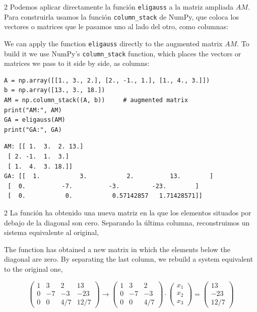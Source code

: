\begin{paracol}{2}
Podemos aplicar directamente la función \texttt{eligauss} a la matriz ampliada $AM$. Para construirla usamos la función \texttt{column\_stack} de NumPy, que coloca los vectores o matrices que le pasamos uno al lado del otro, como columnas:

\switchcolumn

We can apply the function \texttt{eligauss} directly to the augmented matrix $AM$. To build it we use NumPy's \texttt{column\_stack} function, which places the vectors or matrices we pass to it side by side, as columns:
\end{paracol}

\begin{verbatim}
A = np.array([[1., 3., 2.], [2., -1., 1.], [1., 4., 3.]])
b = np.array([13., 3., 18.])
AM = np.column_stack((A, b))     # augmented matrix
print("AM:", AM)
GA = eligauss(AM)
print("GA:", GA)
\end{verbatim}

\begin{verbatim}
AM: [[ 1.  3.  2. 13.]
 [ 2. -1.  1.  3.]
 [ 1.  4.  3. 18.]]
GA: [[  1.           3.           2.          13.        ]
 [  0.          -7.          -3.         -23.        ]
 [  0.           0.           0.57142857   1.71428571]]
\end{verbatim}

\begin{paracol}{2}
La función ha obtenido una nueva matriz en la que los elementos situados por debajo de la diagonal son cero. Separando la última columna, reconstruimos un sistema equivalente al original,

\switchcolumn
The function has obtained a new matrix in which the elements below the diagonal are zero. By separating the last column, we rebuild a system equivalent to the original one,
\end{paracol}

\begin{equation*}
\begin{pmatrix}
1&    3&    2&   13\\
0&   -7&   -3&  -23\\
0&    0&    4/7&    12/7
\end{pmatrix}\rightarrow \begin{pmatrix}
1&    3&    2\\
0&   -7&   -3\\
0&    0&    4/7
\end{pmatrix}\cdot \begin{pmatrix}
x_1\\
x_2\\
x_3
\end{pmatrix}=\begin{pmatrix}
13\\
-23\\
12/7
\end{pmatrix}
\end{equation*}

